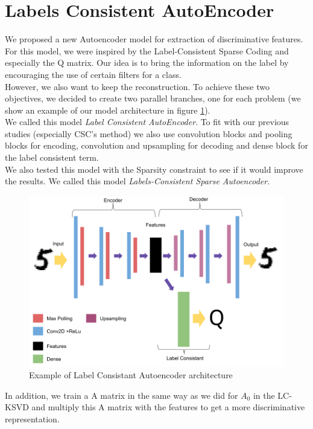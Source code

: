 \section{Labels Consistent AutoEncoder}
We proposed a new Autoencoder model for extraction of discriminative features. For this model, we were inspired by the Label-Consistent Sparse Coding and especially the Q matrix. Our idea is to bring the information on the label by encouraging the use of certain filters for a class.\\
However, we also want to keep the reconstruction. To achieve these two objectives, we decided to create two parallel branches, one for each problem (we show an example of our model architecture in figure \ref{fig:LC_AE}).\\
We called this model \textit{Label Consistent AutoEncoder}.  To fit with our previous studies  (especially CSC's method) we also use convolution blocks and pooling blocks for encoding, convolution and upsampling for decoding and dense block for the label consistent term.\\
We also tested this model with the Sparsity constraint to see if it would improve the results. We called this model \textit{Labels-Consistent Sparse Autoencoder}.\\
\begin{figure}[h]
 \centering
 \includegraphics[scale=0.5]{LC_AutoEncoder.png}
 \caption{Example of Label Consistant Autoencoder architecture}
 \label{fig:LC_AE}
\end{figure}
In addition, we train a A matrix in the same way as we did for $A_0$ in the LC-KSVD and multiply this A matrix with the features to get a more discriminative representation.
\newpage
